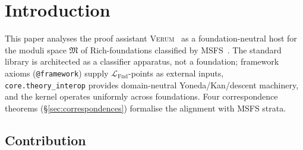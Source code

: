 \documentclass[11pt, a4paper]{article}
\theoremstyle{definition}
\theoremstyle{remark}
\newcommand{\fM}{\mathfrak{M}}
\newcommand{\LFnd}{\mathcal{L}_{\mathrm{Fnd}}}
\newcommand{\Verum}{\textsc{Verum}}
\begin{document}
\tableofcontents

\section{Introduction}
\label{sec:intro}

This paper analyses the proof assistant \Verum{}~\cite{VerumRepo,VerumDocs} as a foundation-neutral host for the moduli space $\fM$ of Rich-foundations classified by MSFS~\cite{Sereda2026MSFS}. The standard library is architected as a classifier apparatus, not a foundation; framework axioms (\texttt{@framework}) supply $\LFnd$-points as external inputs, \texttt{core.theory\_interop} provides domain-neutral Yoneda/Kan/descent machinery, and the kernel operates uniformly across foundations. Four correspondence theorems (\S\ref{sec:correspondences}) formalise the alignment with MSFS strata.

\subsection{Contribution}
\label{subsec:contribution}
\end{document}
